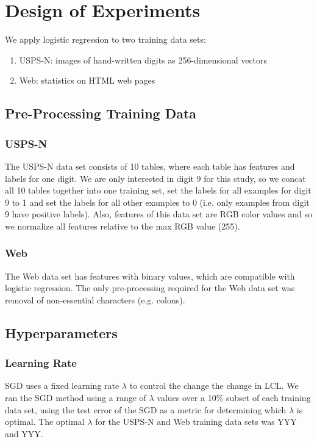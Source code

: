 \documentclass[10pt]{article}
\begin{document}
\section{Design of Experiments}
\label{sec:experiments}

We apply logistic regression to two training data sets:
\begin{enumerate}
    \item USPS-N: images of hand-written digits as 256-dimensional vectors \cite{USPS}
    \item Web: statistics on HTML web pages \cite{Web}
\end{enumerate}


\subsection{Pre-Processing Training Data}

\subsubsection{USPS-N}
The USPS-N data set consists of 10 tables, where each table has features and labels for one digit. We are only interested in digit 9 for this study, so we concat all 10 tables together into one training set, set the labels for all examples for digit 9 to 1 and set the labels for all other examples to 0 (i.e. only examples from digit 9 have positive labels). Also, features of this data set are RGB color values and so we normalize all features relative to the max RGB value (255).

\subsubsection{Web}
The Web data set has features with binary values, which are compatible with logistic regression. The only pre-processing required for the Web data set was removal of non-essential characters (e.g. colons).


\subsection{Hyperparameters}

\subsubsection{Learning Rate}
SGD uses a fixed learning rate $\lambda$ to control the change the change in LCL. We ran the SGD method using a range of $\lambda$ values over a 10\% subset of each training data set, using the test error of the SGD as a metric for determining which $\lambda$ is optimal. The optimal $\lambda$ for the USPS-N and Web training data sets was YYY and YYY.
\end{document}
